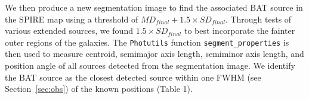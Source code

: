We then produce a new segmentation image to find the associated BAT source in the SPIRE map using a threshold of $MD_{final} + 1.5\times SD_{final}$. Through tests of various extended sources, we found $1.5\times SD_{final}$ to best incorporate the fainter outer regions of the galaxies. The \texttt{Photutils} function \texttt{segment\_properties} is then used to measure centroid, semimajor axis length, semiminor axis length, and position angle of all sources detected from the segmentation image. We identify the BAT source as the closest detected source within one FWHM (see Section~\ref{sec:obs}) of the known positions (Table 1). 
  
  